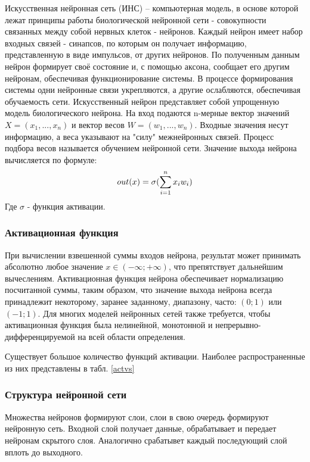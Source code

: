 Искусственная нейронная сеть (ИНС) – компьютерная модель, в основе которой лежат принципы работы биологической нейронной сети - совокупности связанных между собой нервных клеток - нейронов. Каждый нейрон имеет набор входных связей - синапсов, по которым он получает информацию, представленную в виде импульсов, от других нейронов. По полученным данным нейрон формирует своё состояние и, с помощью аксона, сообщает его другим нейронам, обеспечивая функционирование системы. В процессе формирования системы одни нейронные связи укрепляются, а другие ослабляются, обеспечивая обучаемость сети.
Искусственный нейрон представляет собой упрощенную модель биологического нейрона. На вход подаются n-мерные вектор значений $X=(x_{1},...,x_{n})$ и вектор весов $W=(w_{1},...,w_{n})$. Входные значения несут информацию, а веса указывают на "силу" межнейронных связей. Процесс подбора весов называется обучением нейронной сети. Значение выхода нейрона вычисляется по формуле: 
\[
  out(x)=\sigma(\sum_{\mathclap{i=1}}^{n} x_{i}w_{i})
\]
Где $\sigma$ - функция активации.

\subsubsection{Активационная функция}
При вычислении взвешенной суммы входов нейрона, результат может принимать абсолютно любое значение $x\in(-\infty;+\infty)$, что препятствует дальнейшим вычеслениям.
Активационная функция нейрона обеспечивает нормализацию посчитанной суммы, таким образом, что значение выхода нейрона всегда принадлежит некоторому, заранее заданному, диапазону, часто: $(0;1)$ или $(-1;1)$. Для многих моделей нейронных сетей также требуется, чтобы активационная функция была нелинейной, монотонной и непрерывно-дифференцируемой на всей области определения.

Существует большое количество функций активации. Наиболее распространенные из них представлены в табл. \ref{actvs}



\subsubsection{Структура нейронной сети}
Множества нейронов формируют слои, слои в свою очередь формируют нейронную сеть. Входной слой получает данные, обрабатывает и передает нейронам скрытого слоя. Аналогично срабатывет каждый последующий слой вплоть до выходного. 

